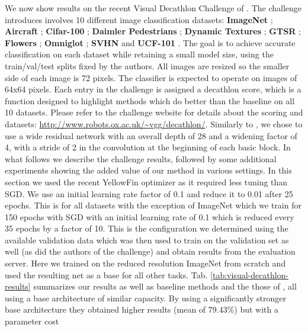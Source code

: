 \documentclass[10pt,journal,compsoc]{IEEEtran}
\begin{document}
We now show results on the recent Visual Decathlon Challenge of \cite{rebuffi2017learning}.
The challenge introduces involves 10 different image classification
datasets: \textbf{ImageNet} \cite{russakovsky2015imagenet}; \textbf{Aircraft}
\cite{maji2013fine}; \textbf{Cifar-100} \cite{krizhevsky2009learning};
\textbf{Daimler Pedestrians} \cite{munder2006experimental}; \textbf{Dynamic
Textures} \cite{journals/corr/CimpoiMKMV13}; \textbf{GTSR} \cite{stallkamp2012man};
\textbf{Flowers} \cite{conf/icvgip/NilsbackZ08}; \textbf{Omniglot}
\cite{lake2015human}; \textbf{SVHN} \cite{netzer2011reading} and\textbf{
UCF-101} \cite{1212.0402v1}. The goal is to achieve accurate classification
on each dataset while retaining a small model size, using the train/val/test
splits fixed by the authors. All images are resized so the smaller
side of each image is 72 pixels. The classifier is expected to operate
on images of 64x64 pixels. Each entry in the challenge is assigned
a decathlon score, which is a function designed to highlight methods
which do better than the baseline on all 10 datasets. Please refer
to the challenge website for details about the scoring and datasets:
\url{http://www.robots.ox.ac.uk/~vgg/decathlon/}. Similarly to \cite{rebuffi2017learning},
we chose to use a wide residual network \cite{journals/corr/ZagoruykoK16}
with an overall depth of 28 and a widening factor of 4, with a stride
of 2 in the convolution at the beginning of each basic block. In what
follows we describe the challenge results, followed by some additional
experiments showing the added value of our method in various settings.
In this section we used the recent YellowFin optimizer \cite{1706.03471v1}
as it required less tuning than SGD. We use an initial learning rate
factor of 0.1 and reduce it to 0.01 after 25 epochs. This is for all
datasets with the exception of ImageNet which we train for 150 epochs
with SGD with an initial learning rate of 0.1 which is reduced every
35 epochs by a factor of 10. This is the configuration we determined
using the available validation data which was then used to train on
the validation set as well (as did the authors of the challenge) and
obtain results from the evaluation server. Here we trained on the
reduced resolution ImageNet from scratch and used the resulting net
as a base for all other tasks. Tab. \ref{tab:visual-decathlon-results}
summarizes our results as well as baseline methods and the those of
\cite{rebuffi2017learning}, all using a base architecture of similar
capacity. By using a significantly stronger base architecture they
obtained higher results (mean of 79.43\%) but with a parameter cost
\end{document}
